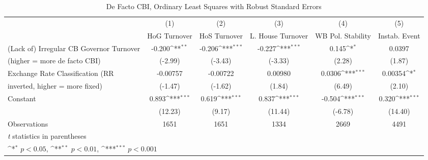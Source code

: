 \begin{table}[htbp]\centering
\def\sym#1{\ifmmode^{#1}\else\(^{#1}\)\fi}
\caption{De Facto CBI, Ordinary Least Squares with Robust Standard Errors \label{multIndOLSDJ}}
\begin{tabular}{l*{5}{c}}
\toprule
                                        &\multicolumn{1}{c}{(1)}&\multicolumn{1}{c}{(2)}&\multicolumn{1}{c}{(3)}&\multicolumn{1}{c}{(4)}&\multicolumn{1}{c}{(5)}\\
                                        &\multicolumn{1}{c}{HoG Turnover}&\multicolumn{1}{c}{HoS Turnover}&\multicolumn{1}{c}{L. House Turnover}&\multicolumn{1}{c}{WB Pol. Stability}&\multicolumn{1}{c}{Instab. Event}\\
\midrule
(Lack of) Irregular CB Governor Turnover&   -0.200\sym{**} &   -0.206\sym{***}&   -0.227\sym{***}&    0.145\sym{*}  &   0.0397         \\
(higher = more de facto CBI)            &  (-2.99)         &  (-3.43)         &  (-3.33)         &   (2.28)         &   (1.87)         \\
\addlinespace
Exchange Rate Classification (RR        & -0.00757         & -0.00722         &  0.00980         &   0.0306\sym{***}&  0.00354\sym{*}  \\
inverted, higher = more fixed)          &  (-1.47)         &  (-1.62)         &   (1.84)         &   (6.49)         &   (2.10)         \\
\addlinespace
Constant                                &    0.893\sym{***}&    0.619\sym{***}&    0.837\sym{***}&   -0.504\sym{***}&    0.320\sym{***}\\
                                        &  (12.23)         &   (9.17)         &  (11.44)         &  (-6.78)         &  (14.40)         \\
\midrule
Observations                            &     1651         &     1651         &     1334         &     2669         &     4491         \\
\bottomrule
\multicolumn{6}{l}{\footnotesize \textit{t} statistics in parentheses}\\
\multicolumn{6}{l}{\footnotesize \sym{*} \(p<0.05\), \sym{**} \(p<0.01\), \sym{***} \(p<0.001\)}\\
\end{tabular}
\end{table}
